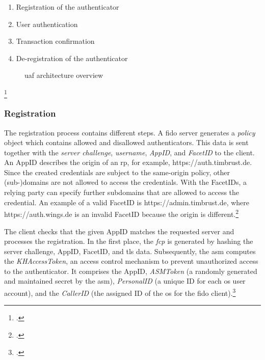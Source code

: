 \begin{enumerate}
	\item Registration of the authenticator
	\item User authentication
	\item Transaction confirmation
	\item De-registration of the authenticator
\end{enumerate}

\begin{figure}[hbt]
	\centering
	
	\caption[\gls{uaf} architecture overview]{\gls{uaf} architecture overview\footnotemark}
	\label{fig:uaf_architecture}
\end{figure}
\footcitetext[Source: diagram by author, based on][4]{uaf-overview}

\subsubsection{Registration}

The registration process contains different steps. A \gls{fido} server generates a \textit{policy} object which contains allowed and disallowed authenticators. This data is sent together with the \textit{server challenge}, \textit{username}, \textit{AppID}, and \textit{FacetID} to the client. An AppID describes the origin of an \gls{rp}, for example, \frqq https://auth.timbrust.de\flqq. Since the created credentials are subject to the same-origin policy, other (sub-)domains are not allowed to access the credentials. With the FacetIDs, a relying party can specify further subdomains that are allowed to access the credential. An example of a valid FacetID is \frqq https://admin.timbrust.de\flqq, where \frqq https://auth.wings.de\flqq{} is an invalid FacetID because the origin is different.\footcites[See][131--132]{10.1007/978-3-319-67639-5_11}[See][17--19]{uaf-protocol}[See][3--4]{uaf-appid-facets}

The client checks that the given AppID matches the requested server and processes the registration. In the first place, the \textit{\gls{fcp}} is generated by hashing the server challenge, AppID, FacetID, and \gls{tls} data. Subsequently, the \gls{asm} computes the \textit{KHAccessToken}, an access control mechanism to prevent unauthorized access to the authenticator. It comprises the AppID, \textit{ASMToken} (a randomly generated and maintained secret by the \gls{asm}), \textit{PersonalID} (a unique ID for each \gls{os} user account), and the \textit{CallerID} (the assigned ID of the \gls{os} for the \gls{fido} client).\footcites[See][131--132]{10.1007/978-3-319-67639-5_11}[See][17--19]{uaf-protocol}

